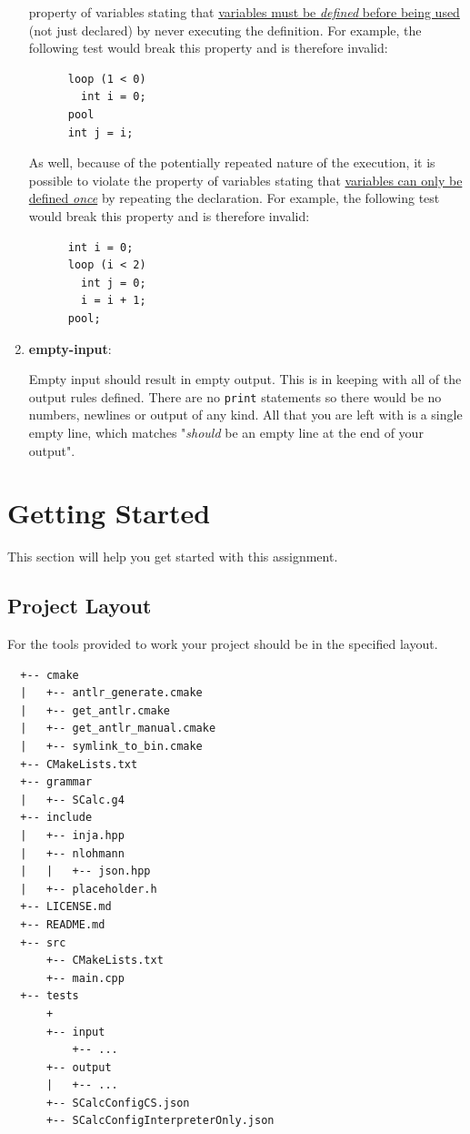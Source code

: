 \documentclass{article}
\newcommand{\code}[1]{\texttt{\textmd{#1}}}
\newcommand{\clarificationdest}[1]{\hypertarget{#1}{\textbf{#1}:}}
\begin{document}
\begin{enumerate}
    property of variables stating that \hyperlink{variable-props}{variables must be
    \textit{defined} before being used} (not just declared) by never executing the definition. For
    example, the following test would break this property and is therefore invalid:
    \begin{lstlisting}
      loop (1 < 0)
        int i = 0;
      pool
      int j = i;
    \end{lstlisting}
    As well, because of the potentially repeated nature of the execution, it is possible to violate
    the property of variables stating that \hyperlink{variable-props}{variables can only be defined
    \textit{once}} by repeating the declaration. For example, the following test would break this
    property and is therefore invalid:
    \begin{lstlisting}
      int i = 0;
      loop (i < 2)
        int j = 0;
        i = i + 1;
      pool;
    \end{lstlisting}
  \item
    \clarificationdest{empty-input}
    Empty input should result in empty output. This is in keeping with all of the output rules
    defined. There are no \code{print} statements so there would be no numbers, newlines or output
    of any kind. All that you are left with is a single empty line, which matches "\textit{should}
    be an empty line at the end of your output".
\end{enumerate}

\section{Getting Started}
This section will help you get started with this assignment.

\subsection{Project Layout}
For the tools provided to work your project should be in the specified layout.

\begin{lstlisting}
  +-- cmake
  |   +-- antlr_generate.cmake
  |   +-- get_antlr.cmake
  |   +-- get_antlr_manual.cmake
  |   +-- symlink_to_bin.cmake
  +-- CMakeLists.txt
  +-- grammar
  |   +-- SCalc.g4
  +-- include
  |   +-- inja.hpp
  |   +-- nlohmann
  |   |   +-- json.hpp
  |   +-- placeholder.h
  +-- LICENSE.md
  +-- README.md
  +-- src
      +-- CMakeLists.txt
      +-- main.cpp
  +-- tests
      +
      +-- input
          +-- ...
      +-- output
      |   +-- ...
      +-- SCalcConfigCS.json
      +-- SCalcConfigInterpreterOnly.json
\end{lstlisting}
\end{document}
